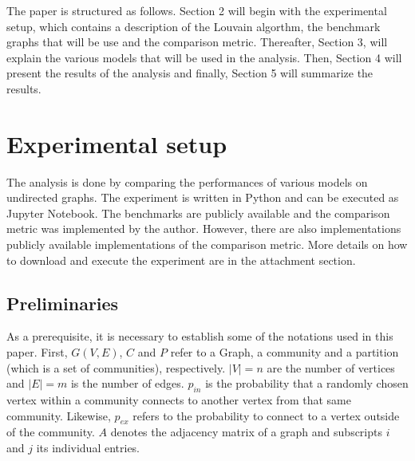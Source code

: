 \documentclass[11pt, twocolumn]{article}
\begin{document}
The paper is structured as follows. Section 2 will begin with the experimental setup, which contains a description of the Louvain algorthm, the benchmark graphs that will be use and the comparison metric. Thereafter, Section 3, will explain the various models that will be used in the analysis. Then, Section 4 will present the results of the analysis and finally, Section 5 will summarize the results.

\section{Experimental setup}
The analysis is done by comparing the performances of various models on undirected graphs. The experiment is written in Python and can be executed as Jupyter Notebook. The benchmarks are publicly available and the comparison metric was implemented by the author. However, there are also implementations publicly available implementations of the comparison metric. More details on how to download and execute the experiment are in the attachment section.

\subsection{Preliminaries}
As a prerequisite, it is necessary to establish some of the notations used in this paper. First, $G(V,E)$, $C$ and $P$ refer to a Graph, a community and a partition (which is a set of communities), respectively. $|V|= n$ are the number of vertices and $|E|=m$ is the number of edges. $p_{in}$ is the probability that a randomly chosen vertex within a community connects to another vertex from that same community. Likewise, $p_{ex}$ refers to the probability to connect to a vertex outside of the community. $A$ denotes the adjacency matrix of a graph and subscripts $i$ and $j$ its individual entries.
\end{document}
